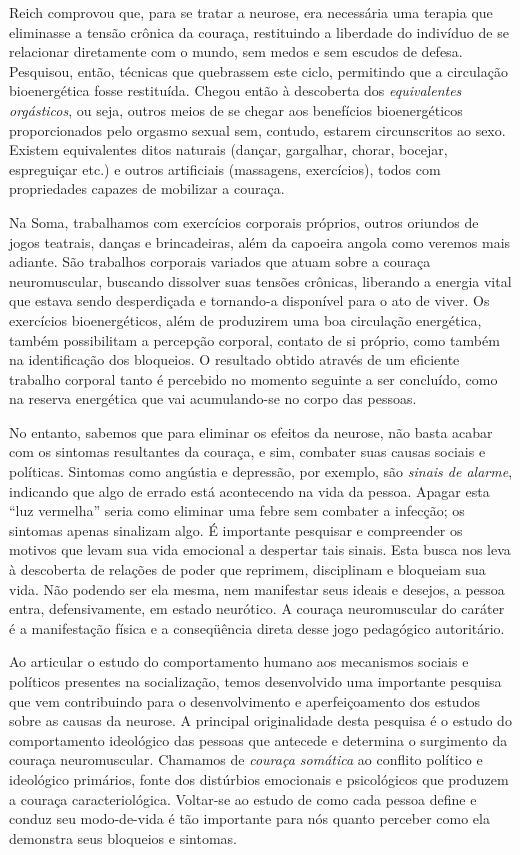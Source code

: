 Reich comprovou que, para se tratar a neurose, era necessária uma
terapia que eliminasse a tensão crônica da couraça, restituindo a
liberdade do indivíduo de se relacionar diretamente com o mundo, sem
medos e sem escudos de defesa. Pesquisou, então, técnicas que quebrassem
este ciclo, permitindo que a circulação bioenergética fosse restituída.
Chegou então à descoberta dos \emph{equivalentes orgásticos}, ou seja,
outros meios de se chegar aos benefícios bioenergéticos proporcionados
pelo orgasmo sexual sem, contudo, estarem circunscritos ao sexo. Existem
equivalentes ditos naturais (dançar, gargalhar, chorar, bocejar,
espreguiçar etc.) e outros artificiais (massagens, exercícios), todos
com propriedades capazes de mobilizar a couraça.

Na Soma, trabalhamos com exercícios corporais próprios, outros oriundos
de jogos teatrais, danças e brincadeiras, além da capoeira angola como
veremos mais adiante. São trabalhos corporais variados que atuam sobre a
couraça neuromuscular, buscando dissolver suas tensões crônicas,
liberando a energia vital que estava sendo desperdiçada e tornando-a
disponível para o ato de viver. Os exercícios bioenergéticos, além de
produzirem uma boa circulação energética, também possibilitam a
percepção corporal, contato de si próprio, como também na identificação
dos bloqueios. O resultado obtido através de um eficiente trabalho
corporal tanto é percebido no momento seguinte a ser concluído, como na
reserva energética que vai acumulando-se no corpo das pessoas.

No entanto, sabemos que para eliminar os efeitos da neurose, não basta
acabar com os sintomas resultantes da couraça, e sim, combater suas
causas sociais e políticas. Sintomas como angústia e depressão, por
exemplo, são \emph{sinais de alarme}, indicando que algo de errado está
acontecendo na vida da pessoa. Apagar esta ``luz vermelha'' seria como
eliminar uma febre sem combater a infecção; os sintomas apenas sinalizam
algo. É importante pesquisar e compreender os motivos que levam sua vida
emocional a despertar tais sinais. Esta busca nos leva à descoberta de
relações de poder que reprimem, disciplinam e bloqueiam sua vida. Não
podendo ser ela mesma, nem manifestar seus ideais e desejos, a pessoa
entra, defensivamente, em estado neurótico. A couraça neuromuscular do
caráter é a manifestação física e a conseqüência direta desse jogo
pedagógico autoritário.

Ao articular o estudo do comportamento humano aos mecanismos sociais e
políticos presentes na socialização, temos desenvolvido uma importante
pesquisa que vem contribuindo para o desenvolvimento e aperfeiçoamento
dos estudos sobre as causas da neurose. A principal originalidade desta
pesquisa é o estudo do comportamento ideológico das pessoas que antecede
e determina o surgimento da couraça neuromuscular. Chamamos de
\emph{couraça somática} ao conflito político e ideológico primários,
fonte dos distúrbios emocionais e psicológicos que produzem a couraça
caracteriológica. Voltar-se ao estudo de como cada pessoa define e
conduz seu modo-de-vida é tão importante para nós quanto perceber como
ela demonstra seus bloqueios e sintomas.

